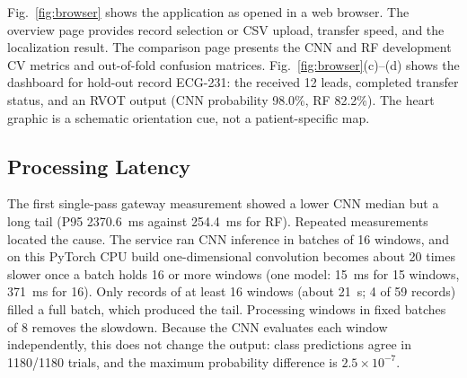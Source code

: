 \documentclass[conference,a4paper]{IEEEtran}
\begin{document}
Fig.~\ref{fig:browser} shows the application as opened in a web browser. The overview page provides record selection or CSV upload, transfer speed, and the localization result. The comparison page presents the CNN and RF development CV metrics and out-of-fold confusion matrices. Fig.~\ref{fig:browser}(c)--(d) shows the dashboard for hold-out record ECG-231: the received 12 leads, completed transfer status, and an RVOT output (CNN probability 98.0\%, RF 82.2\%). The heart graphic is a schematic orientation cue, not a patient-specific map.




\subsection{Processing Latency}
\label{sec:latency}
The first single-pass gateway measurement showed a lower CNN median but a long tail (P95 2370.6~ms against 254.4~ms for RF). Repeated measurements located the cause. The service ran CNN inference in batches of 16 windows, and on this PyTorch CPU build one-dimensional convolution becomes about 20 times slower once a batch holds 16 or more windows (one model: 15~ms for 15 windows, 371~ms for 16). Only records of at least 16 windows (about 21~s; 4 of 59 records) filled a full batch, which produced the tail. Processing windows in fixed batches of 8 removes the slowdown. Because the CNN evaluates each window independently, this does not change the output: class predictions agree in 1180/1180 trials, and the maximum probability difference is $2.5\times10^{-7}$.
\end{document}
